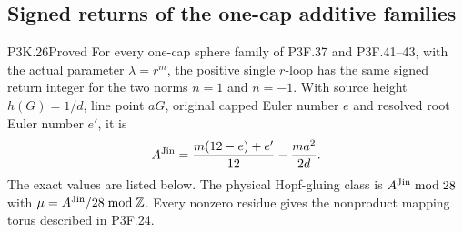 \subsection{Signed returns of the one-cap additive families}

\begin{statement}{P3K.26}{Proved}
For every one-cap sphere family of P3F.37 and P3F.41--43, with the actual parameter $\lambda=r^m$, the positive single $r$-loop has the same signed return integer for the two norms $n=1$ and $n=-1$. With source height $h(G)=1/d$, line point $aG$, original capped Euler number $e$ and resolved root Euler number $e'$, it is
\[
A^{\rm Jin}=\frac{m(12-e)+e'}{12}-\frac{ma^2}{2d}.
\]
The exact values are listed below. The physical Hopf-gluing class is $A^{\rm Jin}\bmod28$ with $\mu=A^{\rm Jin}/28\bmod\mathbb Z$. Every nonzero residue gives the nonproduct mapping torus described in P3F.24.
\end{statement}
